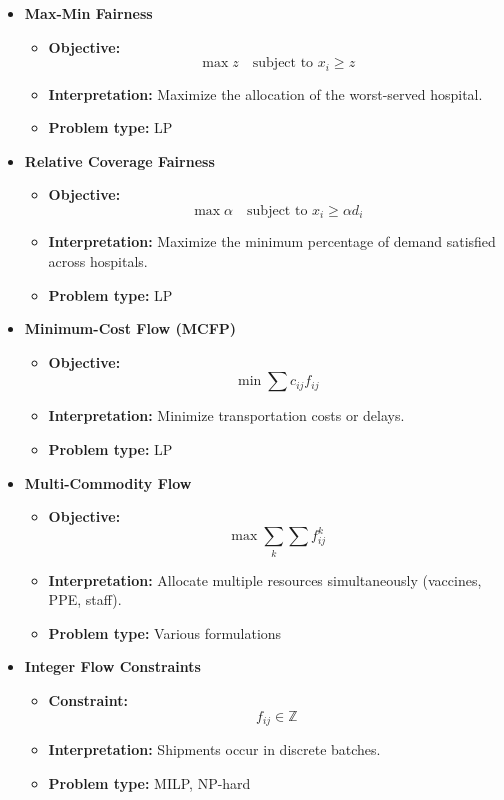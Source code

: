 \begin{itemize}
\item \textbf{Max-Min Fairness}
\begin{itemize}
\item \textbf{Objective:}
\[
\max z \quad \text{subject to } x_i \ge z
\]
\item \textbf{Interpretation:} Maximize the allocation of the worst-served hospital.
\item \textbf{Problem type:} LP
\end{itemize}

\item \textbf{Relative Coverage Fairness}
\begin{itemize}
\item \textbf{Objective:}
\[
\max \alpha \quad \text{subject to } x_i \ge \alpha d_i
\]
\item \textbf{Interpretation:} Maximize the minimum percentage of demand satisfied across hospitals.
\item \textbf{Problem type:} LP
\end{itemize}

\item \textbf{Minimum-Cost Flow (MCFP)}
\begin{itemize}
\item \textbf{Objective:}
\[
\min \sum c_{ij} f_{ij}
\]
\item \textbf{Interpretation:} Minimize transportation costs or delays.
\item \textbf{Problem type:} LP
\end{itemize}

\item \textbf{Multi-Commodity Flow}
\begin{itemize}
\item \textbf{Objective:}
\[
\max \sum_k \sum f_{ij}^k
\]
\item \textbf{Interpretation:} Allocate multiple resources simultaneously (vaccines, PPE, staff).
\item \textbf{Problem type:} Various formulations
\end{itemize}

\item \textbf{Integer Flow Constraints}
\begin{itemize}
\item \textbf{Constraint:}
\[
f_{ij} \in \mathbb{Z}
\]
\item \textbf{Interpretation:} Shipments occur in discrete batches.
\item \textbf{Problem type:} MILP, NP-hard
\end{itemize}


\end{itemize}
